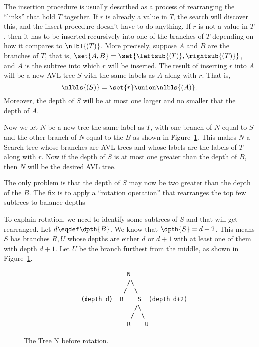 \begin{definition}
The insertion procedure is usually described as a process of
rearranging the ``links'' that hold $T$ together.
\fi
If $r$ is already a value in $T$, the search will discover
this, and the insert procedure doesn't have to do anything.  If $r$ is
not a value in $T$, then it has to be inserted recursively into one of
the branches of $T$ depending on how it compares to $\nlbl{(T)}$.
More precisely, suppose $A$ and $B$ are the branches of $T$, that is,
$\set{A,B}= \set{\leftsub{(T)}, \rightsub{(T)}}$, and $A$ is the
subtree into which $r$ will be inserted.  The result of inserting $r$
into $A$ will be a new AVL tree $S$ with the same labels as $A$ along
with $r$.  That is,
\[
\nlbls{(S)} = \set{r} \union \nlbls{(A)}.
\]
Moreover, the depth of $S$ will be at most one larger and no smaller
that the depth of $A$.

Now we let $N$ be a new tree the same label as $T$, with one branch of
$N$ equal to $S$ and the other branch of $N$ equal to the $B$ as shown
in Figure~\ref{rotate1}.  This makes $N$ a Search tree whose branches
are AVL trees and whose labels are the labels of $T$ along with $r$.
Now if the depth of $S$ is at most one greater than the depth of $B$,
then $N$ will be the desired AVL tree.

The only problem is that the depth of $S$ may now be two greater than
the depth of the $B$.  The fix is to apply a ``rotation operation''
that rearranges the top few subtrees to balance depths.

To explain rotation, we need to identify some subtrees of $S$ and that
will get rearranged.  Let $d \eqdef \dpth{B}$.  We know that $\dpth{S}
= d+2$.  This means $S$ has branches $R,U$ whose depths are either $d$
or $d+1$ with at least one of them with depth $d+1$.  Let $U$ be the
branch furthest from the middle, as shown in Figure~\ref{rotate1}.

\iffalse
where the integer labels indicate the relative sizes of the numerical
labels\fi

\begin{figure}
\begin{verbatim}
                             N
                             /\
                            /  \
                (depth d)  B    S  (depth d+2)
                               /\
                              /  \
                             R    U
\end{verbatim}

\caption{The Tree N before rotation.}

\label{rotate1}


\end{figure}
\end{definition}
